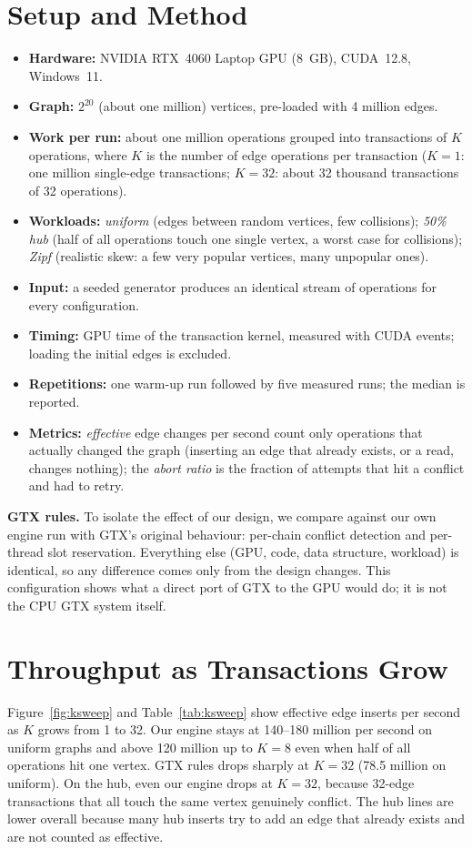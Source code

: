 \documentclass[11pt,a4paper,oneside]{report}
\begin{document}
\section{Setup and Method}
\begin{itemize}
\item \textbf{Hardware:} NVIDIA RTX~4060 Laptop GPU (8~GB), CUDA~12.8, Windows~11.
\item \textbf{Graph:} $2^{20}$ (about one million) vertices, pre-loaded with 4 million edges.
\item \textbf{Work per run:} about one million operations grouped into transactions of $K$ operations, where $K$ is the
  number of edge operations per transaction ($K=1$: one million single-edge transactions; $K=32$: about 32 thousand
  transactions of 32 operations).
\item \textbf{Workloads:} \emph{uniform} (edges between random vertices, few collisions); \emph{50\% hub} (half of all
  operations touch one single vertex, a worst case for collisions); \emph{Zipf} (realistic skew: a few very popular
  vertices, many unpopular ones).
\item \textbf{Input:} a seeded generator produces an identical stream of operations for every configuration.
\item \textbf{Timing:} GPU time of the transaction kernel, measured with CUDA events; loading the initial edges is
  excluded.
\item \textbf{Repetitions:} one warm-up run followed by five measured runs; the median is reported.
\item \textbf{Metrics:} \emph{effective} edge changes per second count only operations that actually changed the graph
  (inserting an edge that already exists, or a read, changes nothing); the \emph{abort ratio} is the fraction of
  attempts that hit a conflict and had to retry.
\end{itemize}

\textbf{GTX rules.} To isolate the effect of our design, we compare against our own engine run with GTX's original
behaviour: per-chain conflict detection and per-thread slot reservation. Everything else (GPU, code, data structure,
workload) is identical, so any difference comes only from the design changes. This configuration shows what a direct
port of GTX to the GPU would do; it is not the CPU GTX system itself.

\section{Throughput as Transactions Grow}
Figure~\ref{fig:ksweep} and Table~\ref{tab:ksweep} show effective edge inserts per second as $K$ grows from 1 to 32.
Our engine stays at 140--180 million per second on uniform graphs and above 120 million up to $K=8$ even when half of
all operations hit one vertex. GTX rules drops sharply at $K=32$ (78.5 million on uniform). On the hub, even our engine
drops at $K=32$, because 32-edge transactions that all touch the same vertex genuinely conflict. The hub lines are lower
overall because many hub inserts try to add an edge that already exists and are not counted as effective.
\end{document}
